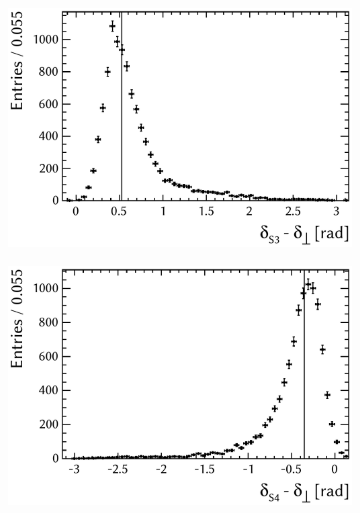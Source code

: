 \begin{figure}[tbp]
  \vspace*{0.02\textwidth}
  \begin{subfigure}{0.49\textwidth}
    \includegraphics[width=\textwidth]{graphics/results/parDist_polarDep_ASOddPhase_bin2}
    \caption{}
  \end{subfigure}
  \hfill%
  \begin{subfigure}{0.49\textwidth}
    \includegraphics[width=\textwidth]{graphics/results/parDist_polarDep_ASOddPhase_bin3}
    \caption{}
  \end{subfigure}


\end{figure}
